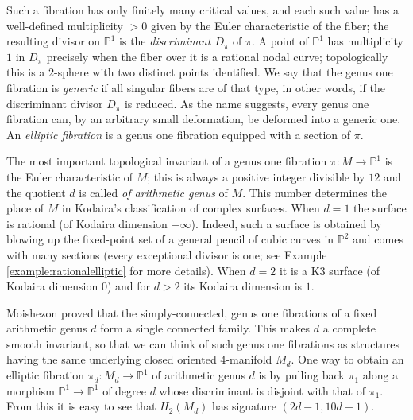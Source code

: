 \documentclass[10pt,letterpaper]{amsart}
\numberwithin{equation}{section}
\def\PP{{\mathbb P}}
\def\Pb{{\mathbb P}}
\theoremstyle{remark}
\begin{document}
Such a fibration has only finitely many critical values, and each such 
value has a well-defined multiplicity $>0$ given by the Euler characteristic  of the fiber; the resulting divisor on $\PP^1$ is the \emph{discriminant $D_\pi$} of $\pi$. A point of $\Pb^1$ has  multiplicity $1$ in  $D_\pi$ precisely when the  fiber over it is a rational nodal curve; topologically this is a $2$-sphere with two distinct points identified. 
We say that the genus one fibration is \emph{generic} if all singular fibers are of that type, in other words, if the discriminant divisor $D_\pi$ is reduced. As the name suggests, every genus one fibration can, by an arbitrary small deformation, be  deformed into a generic one. An {\em elliptic fibration} is a genus one fibration equipped with a section of $\pi$.

The most important topological invariant of a genus one fibration $\pi : M\to \Pb^1$  is  the Euler characteristic of $M$; this is always a positive integer divisible by $12$  and the  quotient $d$  is called  \emph{of arithmetic genus} of  $M$. This number determines the place of $M$ in Kodaira's classification of complex surfaces.
When  $d=1$ the surface is rational  (of Kodaira dimension $-\infty$).  
Indeed, such a surface is obtained by blowing up the fixed-point set of a general pencil of cubic curves in $\Pb^2$ and comes with many sections (every exceptional divisor is one; see Example \ref{example:rationalelliptic} for more details). When  $d=2$ it is a K3 surface  (of Kodaira dimension $0$) and for $d>2$ its Kodaira dimension is $1$.  

Moishezon proved that the 
simply-connected, genus one fibrations of a fixed arithmetic genus $d$  form a single connected family. This  makes $d$ a complete smooth invariant, so that  we can think of such genus one  fibrations as structures having the same underlying closed oriented $4$-manifold $M_d$.  One way to obtain an elliptic fibration $\pi_d:M_d\to\Pb^1$ of arithmetic genus $d$ is by pulling back $\pi_1$  along a morphism $\Pb^1\to\Pb^1$ of degree  $d$ whose discriminant  is disjoint with that of $\pi_1$. From this it is easy to see that $H_2(M_d)$ has signature $(2d-1,10d-1)$.
\end{document}
